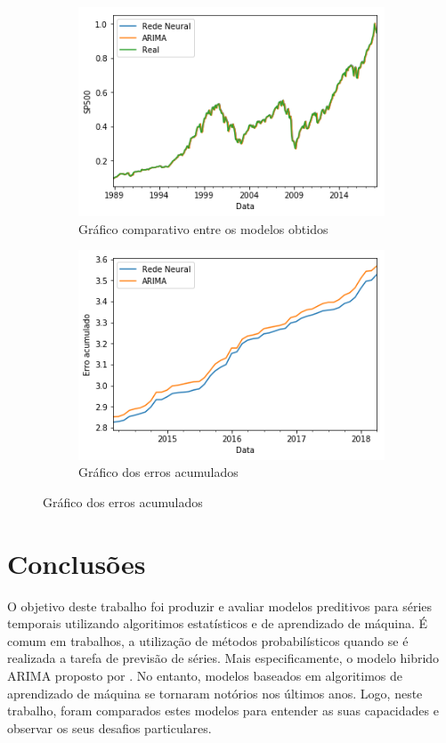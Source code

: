 \documentclass[
    12pt,
    oneside,
    a4paper,
    english,
    brazil
]{abntex2}
\begin{document}
\begin{figure}[ht]
    \caption{Comparativos dos resultados}
    \begin{subfigure}{.5\textwidth}
        \caption{Gráfico comparativo entre os modelos obtidos}\label{fig:comparesp500}
        \includegraphics[width=.8\linewidth]{images/sp500_prediction_compare.png}
    \end{subfigure}
    \begin{subfigure}{.5\textwidth}
        \caption{Gráfico dos erros acumulados}\label{fig:comparesp500}
        \includegraphics[width=.8\linewidth]{images/sp500_cumsum.png}
    \end{subfigure}
\end{figure}

\chapter{Conclusões}\label{chap:concl}

O objetivo deste trabalho foi produzir e avaliar modelos preditivos para séries
temporais utilizando  algoritimos estatísticos e  de aprendizado de  máquina. É
comum  em  trabalhos,  a  utilização  de métodos  probabilísticos  quando  se  é
realizada a tarefa de previsão de séries. Mais especificamente, o modelo hibrido
ARIMA proposto por . No entanto, modelos baseados em algoritimos
de aprendizado  de máquina se tornaram  notórios nos últimos anos.  Logo, neste
trabalho, foram comparados  estes  modelos  para entender as suas capacidades  e
observar os seus desafios particulares.
\end{document}
